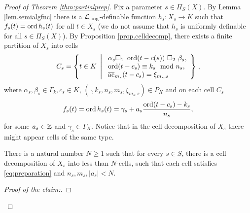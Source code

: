 \begin{proof}[Proof of Theorem \ref{thm:partialprep}]

Fix a parameter $s \in \Pi_S(X)$. By Lemma \ref{lem.semialgfnc} there is a $\mathcal{L}_{\text{ring}}$-definable function {$h_s: X_s\to K$} such that $f_s(t) = \operatorname{ord} h_s(t)$ for all $t \in X_s$ (we do not assume that $h_s$ is uniformly definable for all $s\in \Pi_S(X)$). By Proposition \ref{prop.celldecomp}, there exists a finite partition of $X_s$ into cells  
\begin{equation*}
C_s = \left\{t \in K \ \left| \ \begin{array}{l} \alpha_s \square_1 \ \ord(t-c(s)) \ \square_2 \ \beta_s,\\ \ord(t-c_s) \equiv k_s\mod n_s,\\ \ac_{m_s}(t-c_s) = \xi_{m_s,s} \end{array} \right\}\right.,
\end{equation*}
where $\alpha_s, \beta_s \in \Gamma_k, c_s \in K$, $(\square,k_s, n_s, m_s,\xi_{m_s,s})\in P_K$ and on each cell $C_s$ 
\begin{equation}\label{eq:preparation}
f_s(t)=\operatorname{ord} h_s(t) =\gamma_s + a_s\frac{\operatorname{ord}(t-c_s)-k_s}{n_s},
\end{equation}
for some $a_s\in {\mathbb Z}$ and $\gamma_s\in \Gamma_K$. Notice that in the cell decomposition of $X_s$ there might appear cells of the same type. 

\begin{claim} 
There is a natural number $N\geq 1$ such that for every $s\in S$, there is a cell decomposition of $X_s$ into less than $N$-cells, such that each cell satisfies \ref{eq:preparation} and $n_s,m_s,|a_s|<N$.
\end{claim}

\begin{proof}[Proof of the claim:]


\end{proof}
\end{proof}
